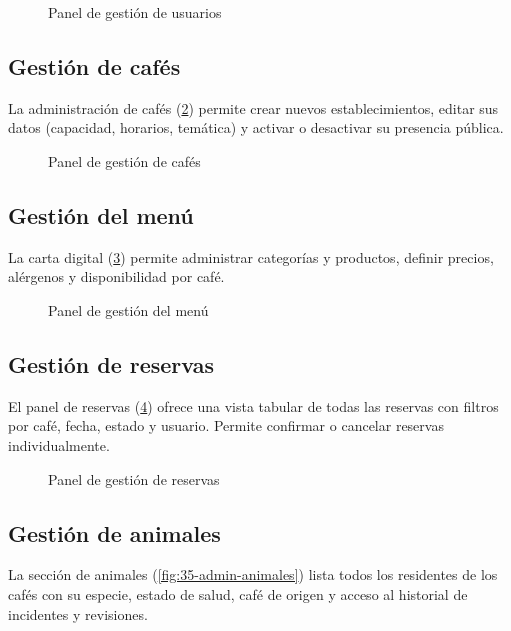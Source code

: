 \documentclass[12pt,a4paper,twoside,openright]{report}
\begin{document}
\begin{figure}[H]
  \centering
  \fbox{\rule{0pt}{6cm}\rule{12cm}{0pt}}
  \caption{Panel de gestión de usuarios}
  \label{fig:31-admin-usuarios}
\end{figure}

\subsection{Gestión de cafés}
La administración de cafés (\cref{fig:32-admin-cafes}) permite crear nuevos
establecimientos, editar sus datos (capacidad, horarios, temática) y activar o
desactivar su presencia pública.

\begin{figure}[H]
  \centering
  \fbox{\rule{0pt}{6cm}\rule{12cm}{0pt}}
  \caption{Panel de gestión de cafés}
  \label{fig:32-admin-cafes}
\end{figure}

\subsection{Gestión del menú}
La carta digital (\cref{fig:33-admin-menu}) permite administrar categorías y
productos, definir precios, alérgenos y disponibilidad por café.

\begin{figure}[H]
  \centering
  \fbox{\rule{0pt}{6cm}\rule{12cm}{0pt}}
  \caption{Panel de gestión del menú}
  \label{fig:33-admin-menu}
\end{figure}

\subsection{Gestión de reservas}
El panel de reservas (\cref{fig:34-admin-reservas}) ofrece una vista tabular de
todas las reservas con filtros por café, fecha, estado y usuario. Permite confirmar
o cancelar reservas individualmente.

\begin{figure}[H]
  \centering
  \fbox{\rule{0pt}{6cm}\rule{12cm}{0pt}}
  \caption{Panel de gestión de reservas}
  \label{fig:34-admin-reservas}
\end{figure}

\subsection{Gestión de animales}
La sección de animales (\cref{fig:35-admin-animales}) lista todos los residentes
de los cafés con su especie, estado de salud, café de origen y acceso al historial
de incidentes y revisiones.
\end{document}
